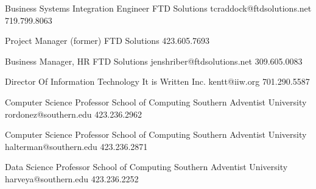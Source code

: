 \begin{multicols}{2}

  {Business Systems Integration Engineer}
  {}
  {FTD Solutions}
  {tcraddock@ftdsolutions.net}
  {719.799.8063}

  {Project Manager (former)}
  {}
  {FTD Solutions}
  {}
  {423.605.7693}

  {Business Manager, HR}
  {}
  {FTD Solutions}
  {jenshriber@ftdsolutions.net}
  {309.605.0083}


  {Director Of Information Technology}
  {}
  {It is Written Inc.}
  {kentt@iiw.org}
  {701.290.5587}

  \columnbreak

  {Computer Science Professor}
  {School of Computing}
  {Southern Adventist University}
  {rordonez@southern.edu}
  {423.236.2962}

  {Computer Science Professor}
  {School of Computing}
  {Southern Adventist University}
  {halterman@southern.edu}
  {423.236.2871}

  {Data Science Professor}
  {School of Computing}
  {Southern Adventist University}
  {harveya@southern.edu}
  {423.236.2252}

\end{multicols}